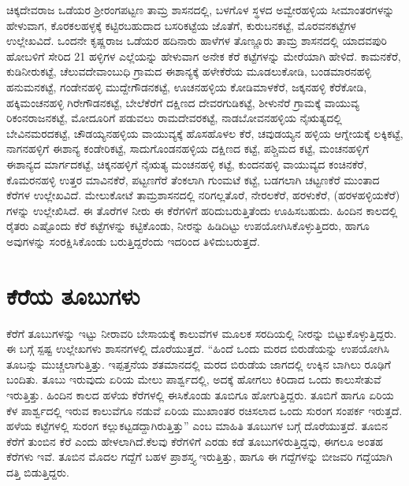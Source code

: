 ಚಿಕ್ಕದೇವರಾಜ ಒಡೆಯರ ಶ‍್ರೀರಂಗಪಟ್ಟಣ ತಾಮ್ರ ಶಾಸನದಲ್ಲಿ, ಬಳಗೊಳ ಸ್ಥಳದ ಅವ್ವೇರಹಳ್ಳಿಯ ಸೀಮಾಂತರಗಳನ್ನು ಹೇಳುವಾಗ, ಕೊರಕಲಹಳ್ಳಕ್ಕೆ ಕಟ್ಟಿರಬಹುದಾದ ಬಸರಿಕಟ್ಟೆಯ ಜೊತೆಗೆ, ಕುರುಬನಕಟ್ಟೆ, ಮೊರವನಕಟ್ಟೆಗಳ ಉಲ್ಲೇಖವಿದೆ. ಒಂದನೇ ಕೃಷ್ಣರಾಜ ಒಡೆಯರ ಹದಿನಾರು ಹಾಳೆಗಳ ತೊಣ್ಣೂರು ತಾಮ್ರ ಶಾಸನದಲ್ಲಿ ಯಾದವಪುರಿ ಹೋಬಳಿಗೆ ಸೇರಿದ 21 ಹಳ್ಳಿಗಳ ಎಲ್ಲೆಯನ್ನು ಹೇಳುವಾಗ ಅನೇಕ ಕೆರೆ ಕಟ್ಟೆಗಳನ್ನು ಮೇರೆಯಾಗಿ ಹೇಳಿದೆ. ಕಾಮನಕೆರೆ, ಕುಡಿನೀರುಕಟ್ಟೆ, ಚೆಲುವದೇವಾಂಬುಧಿ ಗ್ರಾಮದ ಈಶಾನ್ಯಕ್ಕೆ ಹಳೇಕೆರೆಯ ಮೂಡಲುಕೋಡಿ, ಬಂಡಮಾರನಹಳ್ಳಿ ಹನುಮನಕಟ್ಟೆ, ಗಂಡೇನಹಳ್ಳಿ ಮುದ್ದೇಗೌಡನಕಟ್ಟೆ, ಊಚನಹಳ್ಳಿಯ ಕೋಡಿಮಾಳಕೆರೆ, ಜಕ್ಕನಹಳ್ಳಿ ಕೆರೆಕೋಡಿ, ಹಕ್ಕಿಮಂಚನಹಳ್ಳಿ ಗಿರೇಗೌಡನಕಟ್ಟೆ, ಬೇಲೆಕೆರೆಗೆ ದಕ್ಷಿಣದ ದೇವರಗುಡಿಕಟ್ಟೆ, ಶೀಳುನೆರೆ ಗ್ರಾಮಕ್ಕೆ ವಾಯುವ್ಯ ರಿಕಂನರಾಜನಕಟ್ಟೆ, ಮೋದೂರಿಗೆ ಪಡುವಲು ರಾಮದೇವರಕಟ್ಟೆ, ನಾಡಬೋವನಹಳ್ಳಿಯ ನೈಋತ್ಯದಲ್ಲಿ ಬೇವಿನಮರದಕಟ್ಟೆ, ಚೌಡಯ್ಯನಹಳ್ಳಿಯ ವಾಯುವ್ಯಕ್ಕೆ ಹೊಸಹೊಳಲ ಕೆರೆ, ಚವುಡಯ್ಯನ ಹಳ್ಳಿಯ ಆಗ್ನೇಯಕ್ಕೆ ಲಕ್ಕಿಕಟ್ಟೆ, ನಾಗನಹಳ್ಳಿಗೆ ಈಶಾನ್ಯ ಕಂಡೇರಿಕಟ್ಟೆ, ಸಾದುಗೊಂಡನಹಳ್ಳಿಯ ದಕ್ಷಿಣದ ಕಟ್ಟೆ, ಪಶ್ಚಿಮದ ಕಟ್ಟೆ, ಮಂಚನಹಳ್ಳಿಗೆ ಈಶಾನ್ಯದ ಮಾರ್ಗದಕಟ್ಟೆ, ಚಿಕ್ಕನಹಳ್ಳಿಗೆ ನೈಋತ್ಯ ಮಂಚನಹಳ್ಳಿ ಕಟ್ಟೆ, ಕುಂದನಹಳ್ಳಿ ವಾಯುವ್ಯದ ಕಂಚಿನಕೆರೆ, ಕೊಮರನಹಳ್ಳಿ ಉತ್ತರ ಮಾವಿನಕೆರೆ, ಪಟ್ಟಣಗೆರೆ ತೆಂಕಲಾಗಿ ಗುಂಮಟೆ ಕಟ್ಟೆ, ಬಡಗಲಾಗಿ ಚಟ್ಟಣಕೆರೆ ಮುಂತಾದ ಕೆರೆಗಳ ಉಲ್ಲೇಖವಿದೆ. ಮೇಲುಕೋಟೆ ತಾಮ್ರಶಾಸನದಲ್ಲಿ ನರಿಗಲ್ಲತೊರೆ, ನೇರಲಕೆರೆ, ಹರಳುಕೆರೆ, (ಹರಳಹಳ್ಳಿಯಕೆರೆ) ಗಳನ್ನು ಉಲ್ಲೇಖಿಸಿದೆ. ಈ ತೊರೆಗಳ ನೀರು ಈ ಕೆರೆಗಳಿಗೆ ಹರಿದುಬರುತ್ತಿತೆಂದು ಊಹಿಸಬಹುದು. ಹಿಂದಿನ ಕಾಲದಲ್ಲಿ ರೈತರು ಎಷ್ಟೊಂದು ಕೆರೆ ಕಟ್ಟೆಗಳನ್ನು ಕಟ್ಟಿಕೊಂಡು, ನೀರನ್ನು ಹಿಡಿದಿಟ್ಟು ಉಪಯೋಗಿಸಿಕೊಳ್ಳುತ್ತಿದರು, ಹಾಗೂ ಅವುಗಳನ್ನು ಸಂರಕ್ಷಿಸಿಕೊಂಡು ಬರುತ್ತಿದ್ದರೆಂದು ಇದರಿಂದ ತಿಳಿದುಬರುತ್ತದೆ.

\section*{ಕೆರೆಯ ತೂಬುಗಳು}

ಕೆರೆಗೆ ತೂಬುಗಳನ್ನು ಇಟ್ಟು ನೀರಾವರಿ ಬೇಸಾಯಕ್ಕೆ ಕಾಲುವೆಗಳ ಮೂಲಕ ಸರದಿಯಲ್ಲಿ ನೀರನ್ನು ಬಿಟ್ಟುಕೊಳ್ಳುತ್ತಿದ್ದರು. ಈ ಬಗ್ಗೆ ಸ್ಪಷ್ಟ ಉಲ್ಲೇಖಗಳು ಶಾಸನಗಳಲ್ಲಿ ದೊರೆಯುತ್ತದೆ. “ಹಿಂದೆ ಒಂದು ಮರದ ಬಿರುಡೆಯನ್ನು ಉಪಯೋಗಿಸಿ ತೂಬನ್ನು ಮುಚ್ಚಲಾಗುತ್ತಿತ್ತು. ಇಪ್ಪತ್ತನೆಯ ಶತಮಾನದಲ್ಲಿ ಮರದ ಬಿರುಡೆಯ ಜಾಗದಲ್ಲಿ ಉಕ್ಕಿನ ಬಾಗಿಲು ರೂಢಿಗೆ ಬಂದಿತು. ತೂಬು ಇರುವುದು ಏರಿಯ ಮೇಲು ಪಾರ್ಶ್ವದಲ್ಲಿ, ಅದಕ್ಕೆ ಹೋಗಲು ಕಿರಿದಾದ ಒಂದು ಕಾಲುಸೇತುವೆ ಇರುತ್ತಿತ್ತು. ಹಿಂದಿನ ಕಾಲದ ಹಳೆಯ ಕೆರೆಗಳಲ್ಲಿ ಈಸಿಕೊಂಡು ತೂಬಿಗೂ ಹೋಗುತ್ತಿದ್ದರು. ತೂಬಿಗೆ ಹಾಗೂ ಏರಿಯ ಕೆಳ ಪಾರ್ಶ್ವದಲ್ಲಿ ಇರುವ ಕಾಲುವೆಗೂ ನಡುವೆ ಏರಿಯ ಮುಖಾಂತರ ರಚಿಸಲಾದ ಒಂದು ಸುರಂಗ ಸಂಪರ್ಕ ಇರುತ್ತದೆ. ಹಳೆಯ ಕಟ್ಟೆಗಳಲ್ಲಿ ಸುರಂಗ ಕಲ್ಲುಕಟ್ಟಡದ್ದಾಗಿರುತ್ತಿತ್ತು” ಎಂಬ ಮಾಹಿತಿ ತೂಬುಗಳ ಬಗ್ಗೆ ದೊರೆಯುತ್ತದೆ. ತೂಬಿನ ಕೆರೆಗೆ ತುಂಬಿನ ಕೆರೆ ಎಂದು ಹೇಳಲಾಗಿದೆ.ಕೆಲವು ಕೆರೆಗಳಿಗೆ ಎರಡು ಕಡೆ ತೂಬುಗಳಿರುತ್ತಿದ್ದವು, ಈಗಲೂ ಅಂತಹ ಕೆರೆಗಳು ಇವೆ. ತೂಬಿನ ಮೊದಲ ಗದ್ದೆಗೆ ಬಹಳ ಪ್ರಾಶಸ್ತ್ಯ ಇರುತ್ತಿತ್ತು, ಹಾಗೂ ಈ ಗದ್ದೆಗಳನ್ನು ಬೀಜವರಿ ಗದ್ದೆಯಾಗಿ ದತ್ತಿ ಬಿಡುತ್ತಿದ್ದರು.

